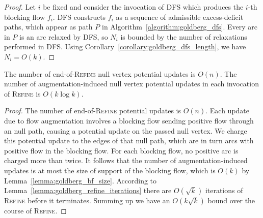 \documentclass[a4paper,UKenglish]{socg-lipics-v2018}
\def\polylog{\mathop{\mathrm{polylog}}}
\theoremstyle{plain}
\numberwithin{figure}{section}
\begin{document}
\begin{toappendix}
\begin{proof}
Let $i$ be fixed and consider the invocation of \textsc{DFS} which produces the
$i$-th blocking flow $f_i$.
\textsc{DFS} constructs $f_i$ as a sequence of admissible excess-deficit paths,
which appear as path $P$ in Algorithm~\ref{algorithm:goldberg_dfs}.
Every arc in $P$ is an arc relaxed by \textsc{DFS}, so $N_i$ is bounded by the
number of relaxations performed in \textsc{DFS}.
Using Corollary~\ref{corollary:goldberg_dfs_length}, we have $N_i = O(k)$.
\end{proof}


\begin{lemmarep}
\label{lemma:empty_updates}
The number of end-of-\textsc{Refine} null vertex potential updates is $O(n)$.
The number of augmentation-induced null vertex potential updates in each
invocation of \textsc{Refine} is $O(k\log k)$.
\end{lemmarep}

\begin{proof}
The number of end-of-\textsc{Refine} potential updates is $O(n)$.
Each update due to flow augmentation involves a blocking flow sending positive
flow through an null path, causing a potential update on the passed
null vertex.
We charge this potential update to the edges of that null path, which are in
turn arcs with positive flow in the blocking flow.
For each blocking flow, no positive arc is charged more than twice.
It follows that the number of augmentation-induced updates is at most the size of support of the blocking flow, which is $O(k)$
by Lemma~\ref{lemma:goldberg_bf_size}.
According to Lemma~\ref{lemma:goldberg_refine_iterations} there are $O(\sqrt{k})$ iterations of \textsc{Refine} before it terminates.
Summing up we have an $O(k\sqrt{k})$ bound over the course of \textsc{Refine}.
\end{proof}



\end{toappendix}
\end{document}
